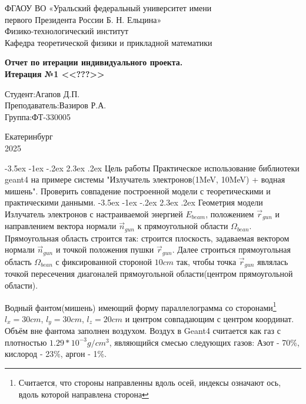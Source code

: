 \documentclass[a4paper,12pt]{article} %
\makeatletter
\renewcommand{\section}{%
  \@startsection{section}{1}{\z@}%
  {-3.5ex \@plus -1ex \@minus -.2ex}%
  {2.3ex \@plus.2ex}%
  {\normalfont\Large\bfseries}%
}
\makeatother
\begin{document}
\begin{titlepage}
\newpage
\begin{center}
ФГАОУ ВО «Уральский федеральный университет имени \\
первого Президента России Б. Н. Ельцина» \\ Физико-технологический институт \\ Кафедра теоретической физики и прикладной математики
\end{center}
\vspace{16em}
\begin{center}
\Large \textbf{Отчет по итерации индивидуального проекта. \\
Итерация №1 <<???>>}
\end{center}
\vspace{16em}
\hfill\parbox{7cm}{ %
Студент:\hfill Агапов Д.П.\\
Преподаватель:\hfill Вазиров Р.А.\\
Группа:\hfill ФТ-330005\\
}
\vspace{\fill}
\begin{center}
Екатеринбург \\2025
\end{center}
\end{titlepage}

\newpage
\section{Цель работы}
Практическое использование библиотеки geant4 на примере системы "Излучатель электронов(1MeV, 10MeV) + водная мишень". Проверить совпадение построенной модели с теоретическими и практическими данными.
\section{Геометрия модели}
Излучатель электронов с настраиваемой энергией $E_{beam}$, положением $\vec r_{gun}$ и направлением вектора нормали $\vec n_{gun}$ к прямоугольной области $\Omega_{bean}$. Прямоугольная область строится так: строится плоскость, задаваемая вектором нормали $\vec n_{gun}$ и точкой положения пушки $\vec r_{gun}$. Далее строиться прямоугольная область $\Omega_{bean}$ с фиксированной стороной $10cm$ так, чтобы точка $\vec r_{gun}$ являлась точкой пересечения диагоналей прямоугольной области(центром прямоугольной области).

Водный фантом(мишень) имеющий форму параллелограмма со сторонами\footnote{Считается, что стороны направленны вдоль осей, индексы означают ось, вдоль которой направлена сторона} $l_x = 30cm$, $l_y=30cm$, $l_z=20cm$ и центром совпадающим с центром координат. Объём вне фантома заполнен воздухом. Воздух в Geant4 считается как газ с плотностью $1.29 * 10^{-3}g/cm^3$, являющийся смесью следующих газов: Азот - 70\%, кислород - 23\%, аргон - 1\%. 
\end{document}
